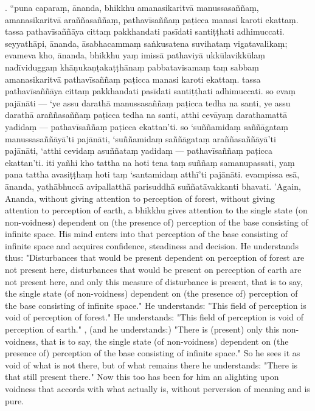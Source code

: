 \documentclass[11pt]{article}
\begin{document}
\begin{paracol}{2}
\begin{column}
 . “puna caparaṃ, ānanda, bhikkhu amanasikaritvā manussasaññaṃ, amanasikaritvā araññasaññaṃ, pathavīsaññaṃ paṭicca manasi karoti ekattaṃ. tassa pathavīsaññāya cittaṃ pakkhandati pasīdati santiṭṭhati adhimuccati. seyyathāpi, ānanda, āsabhacammaṃ saṅkusatena suvihataṃ vigatavalikaṃ; evameva kho, ānanda, bhikkhu yaṃ imissā pathaviyā ukkūlavikkūlaṃ nadīviduggaṃ khāṇukaṇṭakaṭṭhānaṃ pabbatavisamaṃ taṃ sabbaṃ amanasikaritvā pathavīsaññaṃ paṭicca manasi karoti ekattaṃ. tassa pathavīsaññāya cittaṃ pakkhandati pasīdati santiṭṭhati adhimuccati. so evaṃ pajānāti — ‘ye assu darathā manussasaññaṃ paṭicca tedha na santi, ye assu darathā araññasaññaṃ paṭicca tedha na santi, atthi cevāyaṃ darathamattā yadidaṃ — pathavīsaññaṃ paṭicca ekattan’ti. so ‘suññamidaṃ saññāgataṃ manussasaññāyā’ti pajānāti, ‘suññamidaṃ saññāgataṃ araññasaññāyā’ti pajānāti, ‘atthi cevidaṃ asuññataṃ yadidaṃ — pathavīsaññaṃ paṭicca ekattan’ti. iti yañhi kho tattha na hoti tena taṃ suññaṃ samanupassati, yaṃ pana tattha avasiṭṭhaṃ hoti taṃ ‘santamidaṃ atthī’ti pajānāti. evampissa esā, ānanda, yathābhuccā avipallatthā parisuddhā suññatāvakkanti bhavati.
\switchcolumn*
 'Again, Ananda, without giving attention to perception of forest, without giving attention to perception of earth, a bhikkhu gives attention to the single state (on non-voidness) dependent on (the presence of) perception of the base consisting of infinite space. His mind enters into that perception of the base consisting of infinite space and acquires confidence, steadiness and decision. He understands thus: "Disturbances that would be present dependent on perception of forest are not present here, disturbances that would be present on perception of earth are not present here, and only this measure of disturbance is present, that is to say, the single state (of non-voidness) dependent on (the presence of) perception of the base consisting of infinite space." He understands: "This field of perception is void of perception of forest." He understands: "This field of perception is void of perception of earth." , (and he understands:) "There is (present) only this non-voidness, that is to say, the single state (of non-voidness) dependent on (the presence of) perception of the base consisting of infinite space." So he sees it as void of what is not there, but of what remains there he understands: "There is that still present there." Now this too has been for him an alighting upon voidness that accords with what actually is, without perversion of meaning and is pure.
\switchcolumn

\end{column}
\end{paracol}
\end{document}
